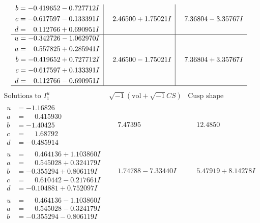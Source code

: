 \documentclass[1p]{elsarticle_modified}
\theoremstyle{definition}
\newcommand{\I}{\sqrt{-1}}
\begin{document}
$$\begin{array}{c|c|c}
\begin{aligned}
b &= -0.419652 - 0.727712 I \\
c &= -0.617597 - 0.133391 I \\
d &= \phantom{-}0.112766 + 0.690951 I\end{aligned}
 & \phantom{-}2.46500 + 1.75021 I & \phantom{-}7.36804 - 3.35767 I \\ \hline\begin{aligned}
u &= -0.342726 - 1.062970 I \\
a &= \phantom{-}0.557825 + 0.285941 I \\
b &= -0.419652 + 0.727712 I \\
c &= -0.617597 + 0.133391 I \\
d &= \phantom{-}0.112766 - 0.690951 I\end{aligned}
 & \phantom{-}2.46500 - 1.75021 I & \phantom{-}7.36804 + 3.35767 I\\
 \hline 
 \end{array}$$\newpage$$\begin{array}{c|c|c}  
\text{Solutions to }I^u_{1}& \I (\text{vol} + \sqrt{-1}CS) & \text{Cusp shape}\\
 \hline 
\begin{aligned}
u &= -1.16826\phantom{ +0.000000I} \\
a &= \phantom{-}0.415930\phantom{ +0.000000I} \\
b &= -1.40425\phantom{ +0.000000I} \\
c &= \phantom{-}1.68792\phantom{ +0.000000I} \\
d &= -0.485914\phantom{ +0.000000I}\end{aligned}
 & \phantom{-}7.47395\phantom{ +0.000000I} & \phantom{-}12.4850\phantom{ +0.000000I} \\ \hline\begin{aligned}
u &= \phantom{-}0.464136 + 1.103860 I \\
a &= \phantom{-}0.545028 + 0.324179 I \\
b &= -0.355294 + 0.806119 I \\
c &= \phantom{-}0.610442 - 0.217661 I \\
d &= -0.104881 + 0.752097 I\end{aligned}
 & \phantom{-}1.74788 - 7.33440 I & \phantom{-}5.47919 + 8.14278 I \\ \hline\begin{aligned}
u &= \phantom{-}0.464136 - 1.103860 I \\
a &= \phantom{-}0.545028 - 0.324179 I \\
b &= -0.355294 - 0.806119 I \\

\end{aligned}
\end{array}$$
\end{document}
